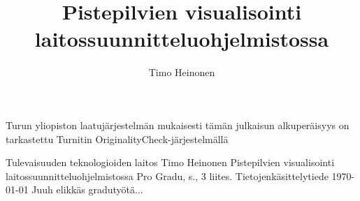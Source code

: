 \newcommand{\code}[1]{\noindent\footnotesize\texttt{#1}\normalsize}
\newcommand{\tab}[0]{\hspace*{1cm}}


\title{Pistepilvien visualisointi laitossuunnitteluohjelmistossa}
\author{Timo Heinonen}
\maketitle
\newpage
\thispagestyle{empty}
\vspace*{10cm}

\vfill

\hspace*{-2cm}\parbox{\textwidth}{Turun yliopiston laatujärjestelmän mukaisesti
  tämän julkaisun alkuperäisyys on tarkastettu Turnitin
  OriginalityCheck-järjestelmällä} 


\newpage
\begin{tiivistelma}%
        {Tulevaisuuden teknologioiden laitos}%
        {Timo Heinonen}%
        {Pistepilvien visualisointi laitossuunnitteluohjelmistossa}
        {Pro Gradu, \pageref{LastPage} s., 3 liites.}%
        {Tietojenkäsittelytiede}%
        {\today}%
	Juuh elikkäs gradutyötä...
\end{tiivistelma}

\tableofcontents %
\newpage












